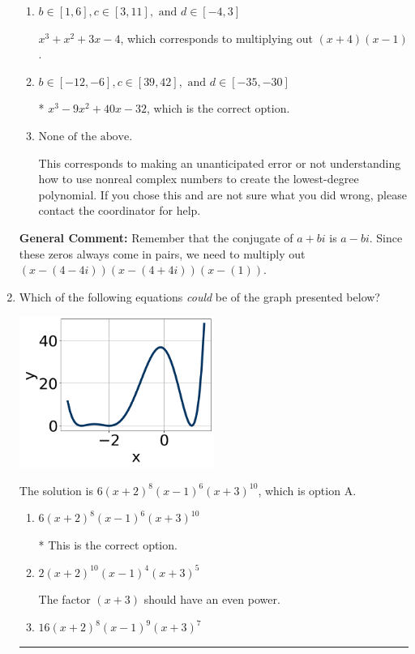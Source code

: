 \documentclass{extbook}[14pt]
\newcommand{\litem}[1]{\item #1

\rule{\textwidth}{0.4pt}}
\begin{document}
\begin{enumerate}
{\begin{enumerate}[label=\Alph*.]
$x^{3} + x^{2} -5 x + 4$, which corresponds to multiplying out $(x -4)(x -1)$.
\item \( b \in [1, 6], c \in [3, 11], \text{ and } d \in [-4, 3] \)

$x^{3} + x^{2} +3 x -4$, which corresponds to multiplying out $(x + 4)(x -1)$.
\item \( b \in [-12, -6], c \in [39, 42], \text{ and } d \in [-35, -30] \)

* $x^{3} -9 x^{2} +40 x -32$, which is the correct option.
\item \( \text{None of the above.} \)

This corresponds to making an unanticipated error or not understanding how to use nonreal complex numbers to create the lowest-degree polynomial. If you chose this and are not sure what you did wrong, please contact the coordinator for help.
\end{enumerate}

\textbf{General Comment:} Remember that the conjugate of $a+bi$ is $a-bi$. Since these zeros always come in pairs, we need to multiply out $(x-(4 - 4 i))(x-(4 + 4 i))(x-(1))$.
}
\litem{
Which of the following equations \textit{could} be of the graph presented below?

\begin{center}
    \includegraphics[width=0.5\textwidth]{../Figures/polyGraphToFunctionC.png}
\end{center}


The solution is \( 6(x + 2)^{8} (x - 1)^{6} (x + 3)^{10} \), which is option A.\begin{enumerate}[label=\Alph*.]
\item \( 6(x + 2)^{8} (x - 1)^{6} (x + 3)^{10} \)

* This is the correct option.
\item \( 2(x + 2)^{10} (x - 1)^{4} (x + 3)^{5} \)

The factor $(x + 3)$ should have an even power.
\item \( 16(x + 2)^{8} (x - 1)^{9} (x + 3)^{7} \)


\end{enumerate}}
\end{enumerate}
\end{document}
